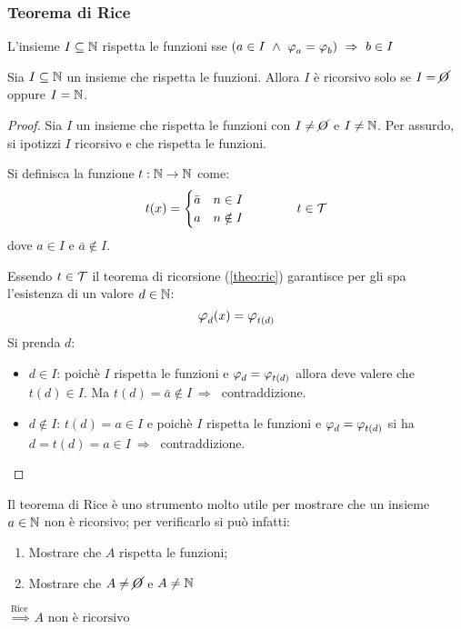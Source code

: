 \subsubsection*{Teorema di Rice}

L'insieme $I\subseteq\mathbb{N}$ rispetta le funzioni sse $(a\in I\ \wedge\ \semRAM_a=\semRAM_b)
\ \Rightarrow \ b\in I$\vspace{1.5em}

\begin{theorem}
    Sia $I\subseteq\mathbb{N}$ un insieme che rispetta le funzioni. Allora $I$ è ricorsivo solo se
    $I=\cancel{O}$ oppure $I=\mathbb{N}$.
\end{theorem}
\begin{proof}
    Sia $I$ un insieme che rispetta le funzioni con $I\neq\cancel{O}$ e $I\neq\mathbb{N}$.
    Per assurdo, si ipotizzi $I$ ricorsivo e che rispetta le funzioni. 

    Si definisca la funzione $t:\mathbb{N}\to\mathbb{N}$ come:
    $$ t(x) = \begin{cases}
        \bar{a} & n\in I\\
        a & n\notin I
    \end{cases} \qquad\qquad t\in\mathcal{T} $$
    dove $a\in I$ e $\bar{a}\notin I$.

    Essendo $t\in\mathcal{T}$ il teorema di ricorsione (\ref{theo:ric}) garantisce per gli spa
    l'esistenza di un valore $d\in\mathbb{N}$:
    $$ \semRAM_d(x) = \semRAM_{t(d)} $$
    Si prenda $d$:
    \begin{itemize}
        \item $d\in I$: poichè $I$ rispetta le funzioni e $\semRAM_d=\semRAM_{t(d)}$ allora
            deve valere che $t(d)\in I$. Ma $t(d)=\bar{a}\notin I\ \Rightarrow \ $
            contraddizione. 
        \item $d\notin I$: $t(d)=a\in I$ e poichè $I$ rispetta le funzioni e 
            $\semRAM_d=\semRAM_{t(d)}$ si ha $d=t(d)=a\in I\ \Rightarrow \ $
            contraddizione. 
    \end{itemize}
\end{proof}

Il teorema di Rice è uno strumento molto utile per mostrare che un insieme $a\in\mathbb{N}$ non
è ricorsivo; per verificarlo si può infatti:

\begin{minipage}{.45\textwidth}
    \begin{enumerate}
        \setlength\itemsep{.6em}
        \item Mostrare che $A$ rispetta le funzioni;
        \item Mostrare che $A\neq\cancel{O}$ e $A\neq\mathbb{N}$
    \end{enumerate}
\end{minipage}
\begin{minipage}{.4\textwidth}
    $ \overset{\text{Rice}}{\ \Longrightarrow} \ \text{$A$ non è ricorsivo} $
\end{minipage}

